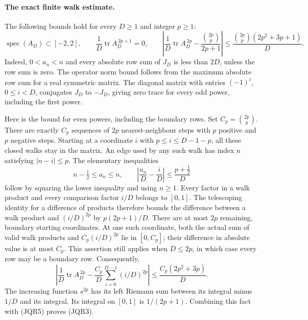 \documentclass[11pt,a4paper]{article}
\begin{document}
\paragraph{The exact finite walk estimate.}
The following bounds hold for every \(D\geq1\) and integer \(p\geq1\):
\[
 \operatorname{spec}(A_D)\subset[-2,2],\qquad
 \frac1D\operatorname{tr}A_D^{\,2p+1}=0,\qquad
 \left|\frac1D\operatorname{tr}A_D^{\,2p}
       -\frac{\binom{2p}{p}}{2p+1}\right|
 \leq \frac{\binom{2p}{p}(2p^2+3p+1)}D .
 \tag{JQR3}
\]
Indeed, \(0<a_n<n\) and every absolute row sum of \(J_D\) is less than
\(2D\), unless the row sum is zero.  The operator norm bound follows
from the maximum absolute row sum for a real symmetric matrix.  The
diagonal matrix with entries \((-1)^i\), \(0\leq i<D\), conjugates
\(J_D\) to \(-J_D\), giving zero trace for every odd power, including
the first power.

Here is the bound for even powers, including the boundary rows.  Set
\(C_p=\binom{2p}{p}\).  There are exactly \(C_p\) sequences of \(2p\)
nearest-neighbour steps with \(p\) positive and \(p\) negative steps.
Starting at a coordinate \(i\) with \(p\leq i\leq D-1-p\), all these
closed walks stay in the matrix.  An edge used by any such walk has
index \(n\) satisfying \(|n-i|\leq p\).  The elementary inequalities
\[
 n-\tfrac12\leq a_n\leq n,\qquad
 \left|\frac{a_n}{D}-\frac{i}{D}\right|
 \leq\frac{p+\tfrac12}{D}
 \tag{JQR4}
\]
follow by squaring the lower inequality and using \(n\geq1\).
Every factor in a walk product and every comparison factor \(i/D\)
belongs to \([0,1]\).  The telescoping identity for a difference of
products therefore bounds the difference between a walk product and
\((i/D)^{2p}\) by \(p(2p+1)/D\).
There are at most \(2p\) remaining, boundary starting coordinates.
At one such coordinate, both the actual sum of valid walk products
and \(C_p(i/D)^{2p}\) lie in \([0,C_p]\); their difference in absolute
value is at most \(C_p\).  This assertion still applies when
\(D\leq2p\), in which case every row may be a boundary row.  Consequently,
\[
 \left|\frac1D\operatorname{tr}A_D^{\,2p}
       -\frac{C_p}{D}\sum_{i=0}^{D-1}(i/D)^{2p}\right|
 \leq\frac{C_p(2p^2+3p)}D.
 \tag{JQR5}
\]
The increasing function \(s^{2p}\) has its left Riemann sum between
its integral minus \(1/D\) and its integral.  Its integral on
\([0,1]\) is \(1/(2p+1)\).  Combining this fact with (JQR5) proves
(JQR3).
\end{document}
